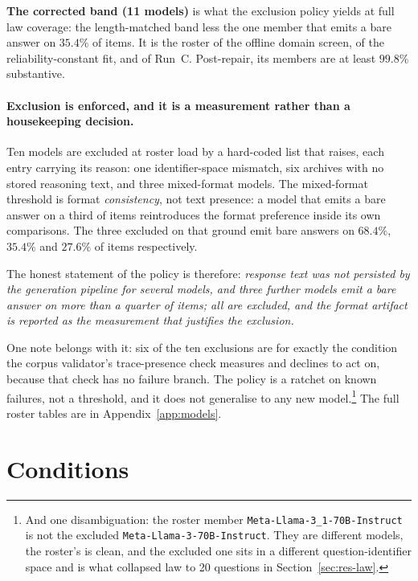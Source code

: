 \textbf{The corrected band (11 models)} is what the exclusion policy
yields at full law coverage: the length-matched band less the one
member that emits a bare answer on $35.4\%$ of items. It is the roster
of the offline domain screen, of the reliability-constant fit, and of
Run~C. Post-repair, its members are at least $99.8\%$ substantive.

\paragraph{Exclusion is enforced, and it is a measurement rather than a
housekeeping decision.}
Ten models are excluded at roster load by a hard-coded list that
raises, each entry carrying its reason: one identifier-space mismatch,
six archives with no stored reasoning text, and three mixed-format
models. The mixed-format threshold is format \emph{consistency}, not
text presence: a model that emits a bare answer on a third of items
reintroduces the format preference inside its own comparisons. The
three excluded on that ground emit bare answers on $68.4\%$, $35.4\%$
and $27.6\%$ of items respectively.

The honest statement of the policy is therefore:
\emph{response text was not persisted by the generation pipeline for
several models, and three further models emit a bare answer on more
than a quarter of items; all are excluded, and the format artifact is
reported as the measurement that justifies the exclusion.}

One note belongs with it: six of the ten exclusions are for exactly
the condition the corpus validator's trace-presence check measures and
declines to act on, because that check has no failure branch. The
policy is a ratchet on known failures, not a threshold, and it does
not generalise to any new model.\footnote{And one disambiguation: the
roster member \texttt{Meta-Llama-3\_1-70B-Instruct} is not the
excluded \texttt{Meta-Llama-3-70B-Instruct}. They are different
models, the roster's is clean, and the excluded one sits in a
different question-identifier space and is what collapsed law to 20
questions in Section~\ref{sec:res-law}.}
The full roster tables are in Appendix~\ref{app:models}.

\section{Conditions}\label{sec:exp-arena-conditions}

